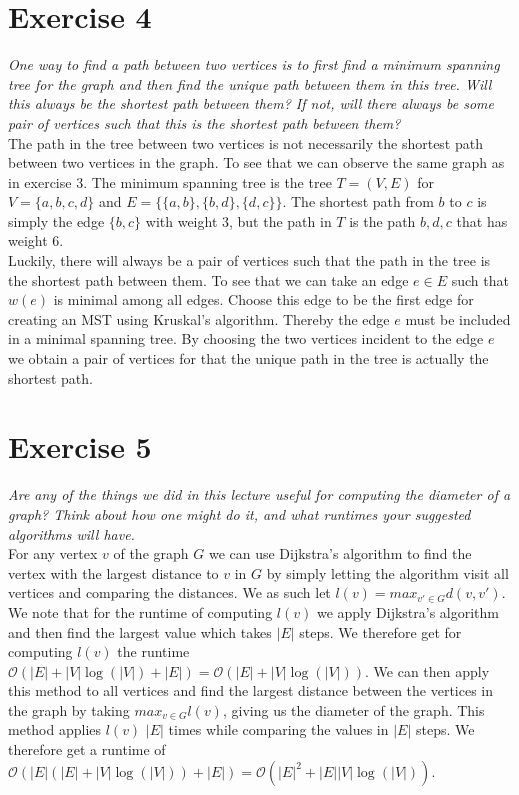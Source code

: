 \documentclass{article}
\begin{document}
\section*{Exercise 4}
\emph{One way to find a path between two vertices is to first find a minimum spanning tree for the graph and then find the unique
path between them in this tree. Will this always be the shortest path between them? If not, will there always be some pair of vertices such that this is the shortest path between them?}\\

The path in the tree between two vertices is not necessarily the shortest path between two vertices in the graph. To see that we can observe the same graph as in exercise 3. The minimum spanning tree is the tree $T = (V,E)$ for $V = \{a,b,c,d\}$ and $E = \{\{a,b\}, \{b,d\}, \{d,c\}\}$. The shortest path from $b$ to $c$ is simply the edge $\{b,c\}$ with weight 3, but the path in $T$ is the path $b,d,c$ that has weight 6.\\
Luckily, there will always be a pair of vertices such that the path in the tree is the shortest path between them. To see that we can take an edge $e \in E$ such that $w(e)$ is minimal among all edges. Choose this edge to be the first edge for creating an MST using Kruskal's algorithm. Thereby the edge $e$ must be included in a minimal spanning tree. By choosing the two vertices incident to the edge $e$ we obtain a pair of vertices for that the unique path in the tree is actually the shortest path.

\section*{Exercise 5}
\emph{Are any of the things we did in this lecture useful for
computing the diameter of a graph? Think about how one might do
it, and what runtimes your suggested algorithms will have.}\\

For any vertex $v$ of the graph $G$ we can use Dijkstra’s algorithm to find the vertex with the largest distance to $v$ in $G$ by simply letting the algorithm visit all vertices and comparing the distances. We as such let $l(v) = max_{v' \in G} d(v, v')$. We note that for the runtime of computing $l(v)$ we apply Dijkstra’s algorithm and then find the largest value which takes $|E|$ steps. We therefore get for computing $l(v)$ the runtime $\mathcal{O}(|E| + |V|\log(|V|) + |E|) = \mathcal{O}(|E| + |V|\log(|V|))$. We can then apply this method to all vertices and find the largest distance between the vertices in the graph by taking $max_{v \in G} l(v)$, giving us the diameter of the graph. This method applies $l(v)$ $|E|$ times while comparing the values in $|E|$ steps. We therefore get a runtime of $\mathcal{O}(|E|(|E| + |V|\log(|V|)) + |E|) = \mathcal{O}(|E|^2 + |E||V|\log(|V|))$.
\end{document}
